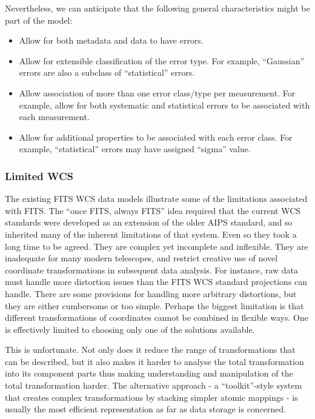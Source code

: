 \documentclass[final,authoryear,5p,times,twocolumn]{elsarticle}
\begin{document}
Nevertheless, we can anticipate that the following general
characteristics might be part of the model:

\begin{itemize}
\item Allow for both metadata and data to have errors.

\item Allow for extensible classification of the error type. For example,
``Gaussian'' errors are also a subclass of ``statistical'' errors.

\item Allow association of more than one error class/type per
measurement. For example, allow for both systematic and statistical
errors to be associated with each measurement.

\item Allow for additional properties to be associated with each error
class. For example, ``statistical'' errors may have assigned ``sigma''
value.
\end{itemize}

\subsubsection{Limited WCS}


The existing FITS WCS data models illustrate some of the limitations
associated with FITS. The ``once FITS, always FITS'' idea required that
the current WCS standards were developed as an extension of the older
AIPS standard, and so inherited many of the inherent limitations of
that system. Even so they took a long time to be agreed. They are
complex yet incomplete and inflexible. They are inadequate for many
modern telescopes, and restrict creative use of novel coordinate
transformations in subsequent data analysis. For instance, raw data
must handle more distortion issues than the FITS WCS standard
projections can handle. There are some provisions for handling more
arbitrary distortions, but they are either cumbersome or too
simple. Perhaps the biggest limitation is that different
transformations of coordinates cannot be combined in flexible
ways. One is effectively limited to choosing only one of the solutions
available.


This is unfortunate. Not only does it reduce the range of
transformations that can be described, but it also makes it harder to
analyse the total transformation into its component parts thus making
understanding and manipulation of the total transformation harder. The
alternative approach - a ``toolkit''-style system that creates complex
transformations by stacking simpler atomic mappings - is usually the
most efficient representation as far as data storage is concerned.
\end{document}
